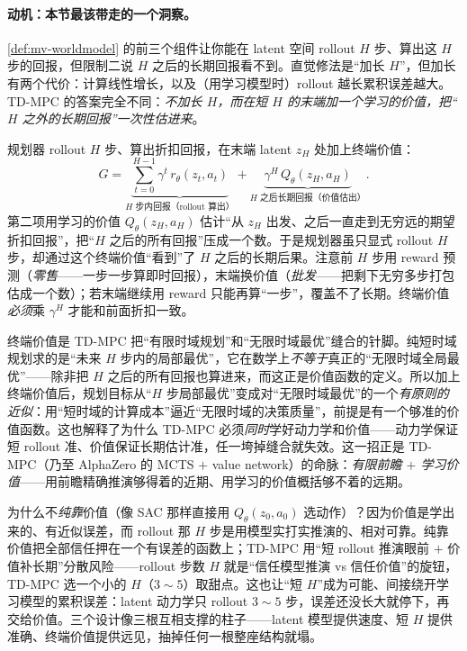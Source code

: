 \paragraph{动机：本节最该带走的一个洞察。}
\cref{def:mv-worldmodel} 的前三个组件让你能在 latent 空间 rollout $H$ 步、算出这 $H$ 步的回报，但限制二说 $H$ 之后的长期回报看不到。直觉修法是“加长 $H$”，但加长有两个代价：计算线性增长，以及（用学习模型时）rollout 越长累积误差越大。TD-MPC 的答案完全不同：\emph{不加长 $H$，而在短 $H$ 的末端加一个学习的价值，把“$H$ 之外的长期回报”一次性估进来}。

\begin{theorem}[终端价值把无穷远未来塞进短时域]\label{thm:mv-terminal}
规划器 rollout $H$ 步、算出折扣回报，在末端 latent $z_H$ 处加上终端价值\cite{hansen2022tdmpc}：
\begin{equation}
  G=\underbrace{\sum_{t=0}^{H-1}\gamma^t\,r_\theta(z_t,a_t)}_{\text{$H$ 步内回报（rollout 算出）}}+\underbrace{\gamma^H\,Q_\theta(z_H,a_H)}_{\text{$H$ 之后长期回报（价值估出）}}.
  \label{eq:mv-terminal}
\end{equation}
第二项用学习的价值 $Q_\theta(z_H,a_H)$ 估计“从 $z_H$ 出发、之后一直走到无穷远的期望折扣回报”，把“$H$ 之后的所有回报”压成一个数。于是规划器虽只显式 rollout $H$ 步，却通过这个终端价值“看到”了 $H$ 之后的长期后果。注意前 $H$ 步用 reward 预测（\emph{零售}——一步一步算即时回报），末端换价值（\emph{批发}——把剩下无穷多步打包估成一个数）；若末端继续用 reward 只能再算“一步”，覆盖不了长期。终端价值\emph{必须}乘 $\gamma^H$ 才能和前面折扣一致。
\end{theorem}

\begin{insight}
终端价值是 TD-MPC 把“有限时域规划”和“无限时域最优”缝合的针脚。纯短时域规划求的是“未来 $H$ 步内的局部最优”，它在数学上\emph{不等于}真正的“无限时域全局最优”——除非把 $H$ 之后的所有回报也算进来，而这正是价值函数的定义。所以加上终端价值后，规划目标从“$H$ 步局部最优”变成对“无限时域最优”的一个\emph{有原则的近似}：用“短时域的计算成本”逼近“无限时域的决策质量”，前提是有一个够准的价值函数。这也解释了为什么 TD-MPC 必须\emph{同时}学好动力学和价值——动力学保证短 rollout 准、价值保证长期估计准，任一垮掉缝合就失效。这一招正是 TD-MPC（乃至 AlphaZero 的 MCTS $+$ value network）的命脉：\emph{有限前瞻 $+$ 学习价值}——用前瞻精确推演够得着的近期、用学习的价值概括够不着的远期。
\end{insight}

\noindent 为什么不\emph{纯靠}价值（像 SAC 那样直接用 $Q_\theta(z_0,a_0)$ 选动作）？因为价值是学出来的、有近似误差，而 rollout 那 $H$ 步是用模型实打实推演的、相对可靠。纯靠价值把全部信任押在一个有误差的函数上；TD-MPC 用“短 rollout 推演眼前 $+$ 价值补长期”分散风险——rollout 步数 $H$ 就是“信任模型推演 vs 信任价值”的旋钮，TD-MPC 选一个小的 $H$（$3\sim5$）取甜点。这也让“短 $H$”成为可能、间接绕开学习模型的累积误差：latent 动力学只 rollout $3\sim5$ 步，误差还没长大就停下，再交给价值。三个设计像三根互相支撑的柱子——latent 模型提供速度、短 $H$ 提供准确、终端价值提供远见，抽掉任何一根整座结构就塌。

